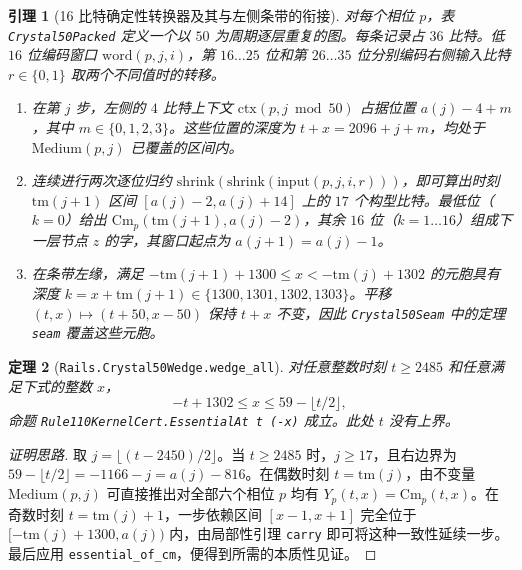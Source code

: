 \documentclass[11pt, a4paper]{article}
\newtheorem{theorem}{定理}[section]
\newtheorem{lemma}[theorem]{引理}
\begin{document}
\begin{lemma}[16 比特确定性转换器及其与左侧条带的衔接]\label{lem:transducer}
对每个相位 $p$，表 \texttt{Crystal50Packed} 定义一个以 $50$ 为周期逐层重复的图。每条记录占 $36$ 比特。低 $16$ 位编码窗口 $\mathrm{word}(p, j, i)$，第 $16\dots 25$ 位和第 $26\dots 35$ 位分别编码右侧输入比特 $r \in \{0, 1\}$ 取两个不同值时的转移。
\begin{enumerate}[label=(\alph*)]
    \item 在第 $j$ 步，左侧的 $4$ 比特上下文 $\mathrm{ctx}(p, j \bmod 50)$ 占据位置 $a(j) - 4 + m$，其中 $m \in \{0, 1, 2, 3\}$。这些位置的深度为 $t + x = 2096 + j + m$，均处于 $\mathrm{Medium}(p, j)$ 已覆盖的区间内。
    \item 连续进行两次逐位归约 $\mathrm{shrink}(\mathrm{shrink}(\mathrm{input}(p, j, i, r)))$，即可算出时刻 $\mathrm{tm}(j+1)$ 区间 $[a(j)-2, a(j)+14]$ 上的 $17$ 个构型比特。最低位（$k=0$）给出 $\mathrm{Cm}_p(\mathrm{tm}(j+1), a(j) - 2)$，其余 $16$ 位（$k=1\dots 16$）组成下一层节点 $z$ 的字，其窗口起点为 $a(j+1) = a(j) - 1$。
    \item 在条带左缘，满足 $-\mathrm{tm}(j+1) + 1300 \le x < -\mathrm{tm}(j) + 1302$ 的元胞具有深度 $k = x + \mathrm{tm}(j+1) \in \{1300,1301,1302,1303\}$。平移 $(t, x) \mapsto (t + 50, x - 50)$ 保持 $t + x$ 不变，因此 \texttt{Crystal50Seam} 中的定理 \texttt{seam} 覆盖这些元胞。
\end{enumerate}
\end{lemma}

\begin{theorem}[\texttt{Rails.Crystal50Wedge.wedge\_all}]\label{thm:wedge_all}
对任意整数时刻 $t \ge 2485$ 和任意满足下式的整数 $x$，
\begin{equation}\label{eq:wedge_region}
-t + 1302 \le x \le 59 - \lfloor t/2 \rfloor,
\end{equation}
命题 \texttt{Rule110KernelCert.EssentialAt t (-x)} 成立。此处 $t$ 没有上界。
\end{theorem}

\begin{proof}[证明思路]
取 $j = \lfloor (t - 2450) / 2 \rfloor$。当 $t \ge 2485$ 时，$j \ge 17$，且右边界为 $59 - \lfloor t/2 \rfloor = -1166 - j = a(j) - 816$。在偶数时刻 $t = \mathrm{tm}(j)$，由不变量 $\mathrm{Medium}(p, j)$ 可直接推出对全部六个相位 $p$ 均有 $Y_p(t, x) = \mathrm{Cm}_p(t, x)$。在奇数时刻 $t = \mathrm{tm}(j) + 1$，一步依赖区间 $[x - 1, x + 1]$ 完全位于 $[-\mathrm{tm}(j) + 1300, a(j))$ 内，由局部性引理 \texttt{carry} 即可将这种一致性延续一步。最后应用 \texttt{essential\_of\_cm}，便得到所需的本质性见证。
\end{proof}
\end{document}
